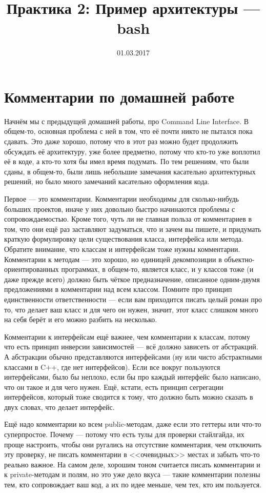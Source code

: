 \documentclass[a5paper]{article}
\title{Практика 2: Пример архитектуры --- bash}
\date{01.03.2017}
\begin{document}
\maketitle
\thispagestyle{empty}

\section{Комментарии по домашней работе}

Начнём мы с предыдущей домашней работы, про Command Line Interface. В общем-то, основная проблема с ней в том, что её почти никто не пытался пока сдавать. Это даже хорошо, потому что в этот раз можно будет продолжить обсуждать её архитектуру, уже более предметно, потому что кто-то уже воплотил её в коде, а кто-то хотя бы имел время подумать. По тем решениям, что были сданы, в общем-то, были лишь небольшие замечания касательно архитектурных решений, но было много замечаний касательно оформления кода. 

Первое --- это комментарии. Комментарии необходимы для сколько-нибудь больших проектов, иначе у них довольно быстро начинаются проблемы с сопровождаемостью. Кроме того, чуть ли не главная польза от комментариев в том, что они ещё раз заставляют задуматься, что и зачем вы пишете, и придумать краткую формулировку цели существования класса, интерфейса или метода. Обратите внимание, что классам и интерфейсам тоже нужны комментарии. Комментарии к методам --- это хорошо, но единицей декомпозиции в объектно-ориентированных программах, в общем-то, является класс, и у классов тоже (и даже прежде всего) должно быть чёткое предназначение, описанное одним-двумя предложениями в комментарии над всем классом. Помните про принцип единственности ответственности --- если вам приходится писать целый роман про то, что делает ваш класс и для чего он нужен, значит, этот класс слишком много на себя берёт и его можно разбить на несколько.

Комментарии к интерфейсам ещё важнее, чем комментарии к классам, потому что есть принцип инверсии зависимостей --- всё должно зависеть от абстракций. А абстракции обычно представляются интерфейсами (ну или чисто абстрактными классами в C++, где нет интерфейсов). Если все вокруг пользуются интерфейсами, было бы неплохо, если бы про каждый интерфейс было написано, что он такое и для чего нужен. Ещё, кстати, есть принцип сегрегации интерфейсов, который тоже сводится к тому, что должно быть можно сказать в двух словах, что делает интерфейс.

Ещё надо комментарии ко всем public-методам, даже если это геттеры или что-то суперпростое. Почему --- потому что есть тулы для проверки стайлгайда, их проще настроить, чтобы они ругались на отсутствие комментария, чем отключить эту проверку, не писать комментарии в <<очевидных>> местах и забыть что-то реально важное. На самом деле, хорошим тоном считается писать комментарии и к private-методам и полям, но это уже дело вкуса --- такие комментарии полезны тем, кто сопровождает ваш код, а их по идее меньше, чем тех, кто им пользуется.
\end{document}
